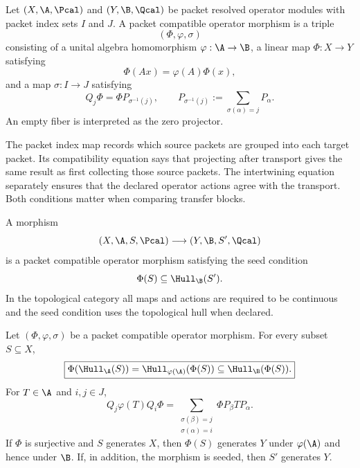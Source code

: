 \begin{definition}
\label{def:packet-morphism}
Let $(X,\A,\Pcal)$ and $(Y,\B,\Qcal)$ be packet resolved operator modules with packet index sets $I$ and $J$.  A packet compatible operator morphism is a triple
\[
(\Phi,\varphi,\sigma)
\]
consisting of a unital algebra homomorphism $\varphi:\A\to\B$, a linear map $\Phi:X\to Y$ satisfying
\[
\Phi(Ax)=\varphi(A)\Phi(x),
\]
and a map $\sigma:I\to J$ satisfying
\[
Q_j\Phi
=
\Phi P_{\sigma^{-1}(j)},
\qquad
P_{\sigma^{-1}(j)}:=
\sum_{\sigma(\alpha)=j}P_\alpha.
\]
An empty fiber is interpreted as the zero projector.
\end{definition}

The packet index map records which source packets are grouped into each target packet.  Its compatibility equation says that projecting after transport gives the same result as first collecting those source packets.  The intertwining equation separately ensures that the declared operator actions agree with the transport.  Both conditions matter when comparing transfer blocks.

\begin{definition}
\label{def:seed-morphism}
A morphism
\[
(X,\A,S,\Pcal)\longrightarrow(Y,\B,S',\Qcal)
\]
is a packet compatible operator morphism satisfying the seed condition
\[
\Phi(S)\subseteq\Hull_{\B}(S').
\]
In the topological category all maps and actions are required to be continuous and the seed condition uses the topological hull when declared.
\end{definition}

\begin{theorem}
\label{thm:naturality}
Let $(\Phi,\varphi,\sigma)$ be a packet compatible operator morphism.  For every subset $S\subseteq X$,
\[
\boxed{
\Phi(\Hull_{\A}(S))
=
\Hull_{\varphi(\A)}(\Phi(S))
\subseteq
\Hull_{\B}(\Phi(S)).
}
\]
For $T\in\A$ and $i,j\in J$,
\[
\boxed{
Q_j\varphi(T)Q_i\Phi
=
\sum_{\substack{\sigma(\beta)=j\\\sigma(\alpha)=i}}
\Phi P_\beta TP_\alpha.
}
\]
If $\Phi$ is surjective and $S$ generates $X$, then $\Phi(S)$ generates $Y$ under $\varphi(\A)$ and hence under $\B$.  If, in addition, the morphism is seeded, then $S'$ generates $Y$.
\end{theorem}


